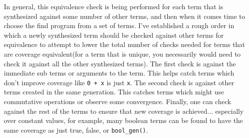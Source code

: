 \documentclass[review, sigplan]{acmart}
\begin{document}
In general, this equivalence check is being performed for each term that is
synthesized against some number of other terms, and then when it comes time to
choose the find program from a set of terms. I've established a rough order in
which a newly synthesized term should be checked against other terms for
equivalence to attempt to lower the total number of checks needed for terms that
are coverage equivalent(for a term that is unique, you necessarily would need to
check it against all the other synthesized terms). The first check is against
the immediate sub terms or arguments to the term. This helps catch terms which
don't improve coverage like \lstinline|0 + x| is just \lstinline|x|. The second
check is against other terms created in the same generation. This catches terms
which might use commutative operations or observe some convergence. Finally, one
can check against the rest of the terms to ensure that new coverage is
achieved... especially over constant values, for example, many boolean terms can
be found to have the same coverage as just true, false, or \lstinline|bool_gen()|.
\end{document}
